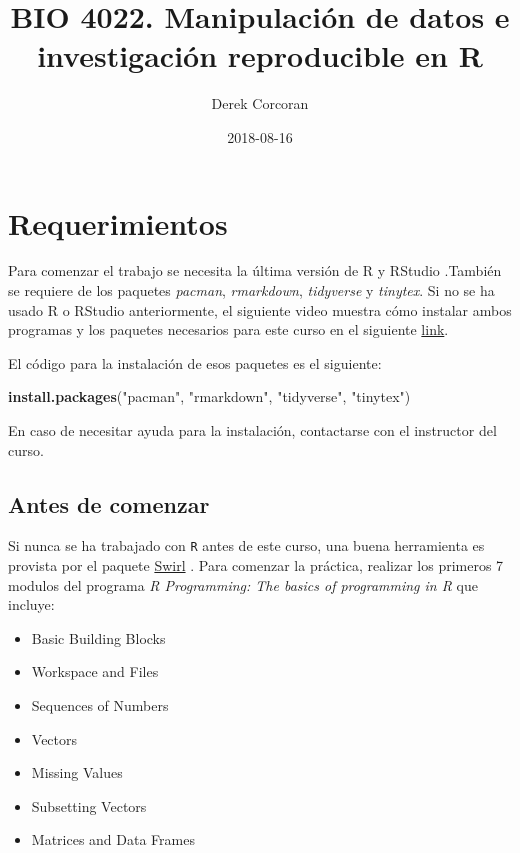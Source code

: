 \documentclass[]{book}
\title{BIO 4022. Manipulación de datos e investigación reproducible en R}
\author{Derek Corcoran}
\date{2018-08-16}
\newenvironment{Shaded}{\begin{snugshade}}{\end{snugshade}}
\newcommand{\KeywordTok}[1]{\textcolor[rgb]{0.13,0.29,0.53}{\textbf{#1}}}
\newcommand{\NormalTok}[1]{#1}
\newcommand{\StringTok}[1]{\textcolor[rgb]{0.31,0.60,0.02}{#1}}
\providecommand{\tightlist}{%
  \setlength{\itemsep}{0pt}\setlength{\parskip}{0pt}}
\begin{document}
\maketitle

{
\setcounter{tocdepth}{1}
\tableofcontents
}
\hypertarget{requerimientos}{%
\chapter*{Requerimientos}\label{requerimientos}}

Para comenzar el trabajo se necesita la última versión de R y RStudio
\citep{R-base}.También se requiere de los paquetes \emph{pacman},
\emph{rmarkdown}, \emph{tidyverse} y \emph{tinytex}. Si no se ha usado R
o RStudio anteriormente, el siguiente video muestra cómo instalar ambos
programas y los paquetes necesarios para este curso en el siguiente
\href{https://youtu.be/RtkCAKXsVbw}{link}.

El código para la instalación de esos paquetes es el siguiente:

\begin{Shaded}
\begin{Highlighting}[]
\KeywordTok{install.packages}\NormalTok{(}\StringTok{"pacman"}\NormalTok{, }\StringTok{"rmarkdown"}\NormalTok{, }\StringTok{"tidyverse"}\NormalTok{, }\StringTok{"tinytex"}\NormalTok{)}
\end{Highlighting}
\end{Shaded}

En caso de necesitar ayuda para la instalación, contactarse con el
instructor del curso.

\hypertarget{antes-de-comenzar}{%
\section{Antes de comenzar}\label{antes-de-comenzar}}

Si nunca se ha trabajado con \texttt{R} antes de este curso, una buena
herramienta es provista por el paquete
\href{http://swirlstats.com/students.html}{Swirl} \citep{Kross2017}.
Para comenzar la práctica, realizar los primeros 7 modulos del programa
\emph{R Programming: The basics of programming in R} que incluye:

\begin{itemize}
\tightlist
\item
  Basic Building Blocks
\item
  Workspace and Files
\item
  Sequences of Numbers
\item
  Vectors
\item
  Missing Values
\item
  Subsetting Vectors
\item
  Matrices and Data Frames
\end{itemize}
\end{document}
